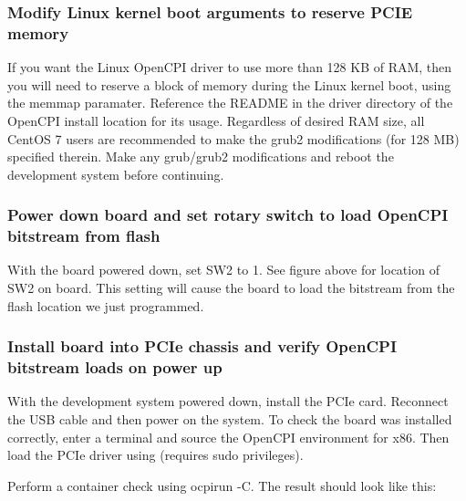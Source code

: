 \subsubsection*{Modify Linux kernel boot arguments to reserve PCIE memory}
If you want the Linux OpenCPI driver to use more than 128 KB of RAM, then you will need to reserve a block of memory during the Linux kernel boot, using the memmap paramater. Reference the README in the driver directory of the OpenCPI install location for its usage. Regardless of desired RAM size, all CentOS 7 users are recommended to make the grub2 modifications (for 128 MB) specified therein. Make any grub/grub2 modifications and reboot the development system before continuing.

\subsubsection*{Power down board and set rotary switch to load OpenCPI bitstream from flash}
With the board powered down, set SW2 to 1. See figure above for location of SW2 on board. This setting will cause the board to load the bitstream from the flash location we just programmed.\par
\subsubsection*{Install board into PCIe chassis and verify OpenCPI bitstream loads on power up}
With the development system powered down, install the PCIe card. Reconnect the USB cable and then power on the system. To check the board was installed correctly, enter a terminal and source the OpenCPI environment for x86. Then load the PCIe driver using (requires sudo privileges).\par\bigskip
\noindent{}\par\bigskip
\noindent Perform a container check using ocpirun -C. The result should look like this:\par\bigskip
\noindent{}
